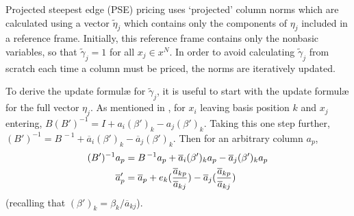 Projected steepest edge (PSE) pricing uses `projected' column
norms which are calculated using a vector $\tilde{\eta}_j$ which contains only
the components of $\eta_j$ included in a reference frame.
Initially, this reference frame contains only the nonbasic variables, so that
$\tilde{\gamma}_j = 1$ for all $x_j \in x^N$.
In order to avoid calculating $\tilde{\gamma}_j$ from scratch each time a
column must be priced, the norms are iteratively updated.

To derive the update formul\ae{} for $\tilde{\gamma}_j$, it is useful to start
with the update formul\ae{} for the full vector $\eta_j$.
As mentioned in ,
for $x_i$ leaving basis position $k$ and
$x_j$ entering, $B(B')^{-1} = I + a_i(\beta')_k - a_j(\beta')_k$.
Taking this one step further, 
$(B')^{-1} = B^{\,-1} + \overline{a}_i(\beta')_k - \overline{a}_j(\beta')_k$.
Then for an arbitrary column $a_p$,
\begin{align}
(B')^{-1}a_p & = B^{\,-1}a_p + \overline{a}_i(\beta')_k a_p -
	\overline{a}_j(\beta')_k a_p \notag \\
\overline{a}'_p & = \overline{a}_p +
	e_k ( \frac{\overline{a}_{kp}}{\overline{a}_{kj}} ) -
	\overline{a}_j ( \frac{\overline{a}_{kp}}{\overline{a}_{kj}} )
	\label{Eqn:abarupdate}
\end{align}
(recalling that $(\beta')_k = \beta_k/\overline{a}_{kj}$).

